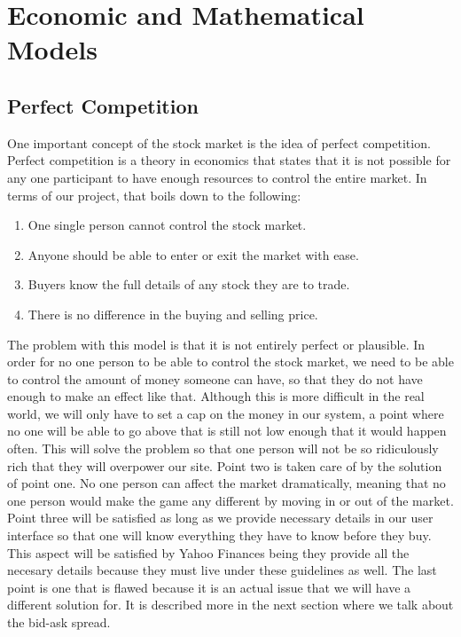 \section{Economic and Mathematical Models}

\subsection{Perfect Competition}

One important concept of the stock market is the idea of perfect competition. Perfect competition is a theory in economics that states that it is not possible for any one participant to have enough resources to control the entire market. In terms of our project, that boils down to the following:
\begin{enumerate}
\item
One single person cannot control the stock market.\cite{inv:pcomp} 
\item
Anyone should be able to enter or exit the market with ease.
\item
Buyers know the full details of any stock they are to trade.
\item
There is no difference in the buying and selling price.\cite{wiki:pcomp}
\end{enumerate}
The problem with this model is that it is not entirely perfect or plausible. In order for no one person to be able to control the stock market, we need to be able to control the amount of money someone can have, so that they do not have enough to make an effect like that. Although this is more difficult in the real world, we will only have to set a cap on the money in our system, a point where no one will be able to go above that is still not low enough that it would happen often. This will solve the problem so that one person will not be so ridiculously rich that they will overpower our site. Point two is taken care of by the solution of point one. No one person can affect the market dramatically, meaning that no one person would make the game any different by moving in or out of the market. Point three will be satisfied as long as we provide necessary details in our user interface so that one will know everything they have to know before they buy. This aspect will be satisfied by Yahoo Finances being they provide all the necesary details because they must live under these guidelines as well. The last point is one that is flawed because it is an actual issue that we will have a different solution for. It is described more in the next section where we talk about the bid-ask spread.


